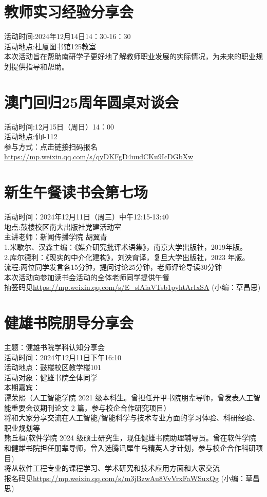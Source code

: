 \documentclass[letterpaper, 12pt]{article}
\begin{document}
\begin{multicols}{2}
\section{教师实习经验分享会}
活动时间:2024年12月14日14：30-16：30\\
活动地点:杜厦图书馆125教室\\
本次活动旨在帮助南研学子更好地了解教师职业发展的实际情况，为未来的职业规划提供指导和帮助。\\

\section{澳门回归25周年圆桌对谈会}
活动时间:12月15日（周日）14：00\\
活动地点:仙Ⅰ-112\\
参与方式：点击链接扫码报名\url{https://mp.weixin.qq.com/s/qyDKFgD4uudCKu9IcDGbXw}\\



\section{新生午餐读书会第七场}
活动时间：2024年12月11日（周三）中午12:15-13:40\\
地点:鼓楼校区南大出版社党建活动室\\
主讲老师：新闻传播学院 胡翼青\\
1.米歇尔、汉森主编：《媒介研究批评术语集》，南京大学出版社，2019年版。 \\
2.库尔德利：《现实的中介化建构》，刘泱育译，复旦大学出版社，2023 年版。\\
流程:两位同学发言各15分钟，提问讨论25分钟，老师评论导读30分钟\\
本次活动向参加读书会活动的全体老师同学提供午餐\\
抽签码见\url{https://mp.weixin.qq.com/s/E_slAiaVTsb1pyhtArIxSA}
(小编：草昌思)\\

\section{健雄书院朋导分享会}
主题：健雄书院学科认知分享会\\
活动时间：2024年12月11日下午16:10\\
活动地点：鼓楼校区教学楼101\\
活动对象：健雄书院全体同学\\
本期嘉宾：\\
谭荣熙（人工智能学院 2021 级本科生。曾担任开甲书院朋辈导师，曾发表人工智能重要会议期刊论文 2 篇，参与校企合作研究项目）\\
将和大家分享交流在人工智能/智能科学与技术专业方面的学习体验、科研经验、职业规划等\\
熊丘桓(软件学院 2024 级硕士研究生，现任健雄书院助理辅导员。曾在软件学院和健雄书院担任朋辈导师，曾入选腾讯犀牛鸟精英人才计划，参与校企合作科研项目)\\
将从软件工程专业的课程学习、学术研究和技术应用方面和大家交流\\
报名码见\url{https://mp.weixin.qq.com/s/m3jBzwAu8VvVrxFaWSuxQg}
(小编：草昌思)\\


\end{multicols}
\end{document}
